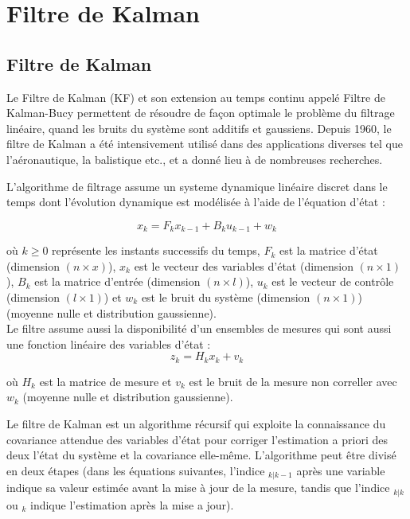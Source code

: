 \documentclass[a4paper,11pt]{StyleThese}
\begin{document}
\dominitoc
\tableofcontents

\chapter{Filtre de Kalman}
\minitoc

\section{Filtre de Kalman}

Le Filtre de Kalman (KF) et son extension au temps continu appelé Filtre de Kalman-Bucy permettent de résoudre de façon optimale le problème du filtrage linéaire, quand les bruits du système sont additifs et gaussiens. Depuis 1960,
le filtre de Kalman a été intensivement utilisé dans des applications diverses tel que l'aéronautique, la balistique etc., et a donné lieu à de nombreuses recherches. 

L'algorithme de filtrage assume un systeme dynamique linéaire discret dans le temps dont l’évolution dynamique est modélisée à l’aide de l’équation d’état :

\begin{equation}
  x_k = F_kx_{k-1} + B_k u_{k-1} + w_k
  \label{equation d'etat}
\end{equation}


où $k \geq 0$ représente les instants successifs du temps, $F_k$ est la matrice d'état (dimension $(n\times x)$), $x_k$ est le vecteur des variables d'état (dimension $(n\times 1)$), $B_k$ est la matrice d'entrée (dimension $(n\times l)$), $u_k$ est le vecteur de contrôle (dimension $(l\times 1)$) et $w_k$ est le bruit du système (dimension $(n\times 1)$) (moyenne nulle et distribution gaussienne).
\\

Le filtre assume aussi la disponibilité d'un ensembles de mesures qui sont aussi une fonction linéaire des variables d'état :
\begin{equation}
  z_k = H_kx_k + v_k
  \label{equation mesure}
\end{equation}

où $H_k$ est la matrice de mesure et $v_k$ est le bruit de la mesure non correller avec $w_k$ (moyenne nulle et distribution gaussienne).

Le filtre de Kalman est un algorithme récursif qui exploite la connaissance du covariance attendue des variables d'état pour corriger l'estimation a priori des deux l'état du système et la covariance elle-même. 
L'algorithme peut être divisé en deux étapes (dans les équations suivantes, l'indice $_{k|k-1}$ après une variable indique sa valeur estimée avant la mise à jour de la mesure, tandis que l'indice $_{k|k}$ ou $_k$ indique l'estimation après la mise a jour).
\end{document}
